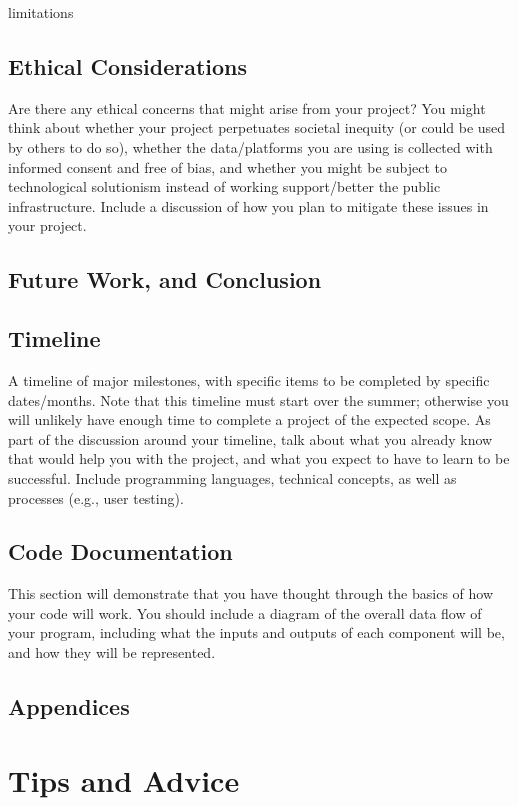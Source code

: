 \documentclass[10pt,twocolumn]{article}
\begin{document}
limitations

\subsection{Ethical Considerations}

Are there any ethical concerns that might arise from your project?
You might think about whether your project perpetuates societal inequity (or could be used by others to do so), whether the data/platforms you are using is collected with informed consent and free of bias, and whether you might be subject to technological solutionism instead of working support/better the public infrastructure.
Include a discussion of how you plan to mitigate these issues in your project.

\subsection{Future Work, and Conclusion}

\subsection{Timeline}

A timeline of major milestones, with specific items to be completed by specific dates/months.
Note that this timeline must start over the summer; otherwise you will unlikely have enough time to complete a project of the expected scope.
As part of the discussion around your timeline, talk about what you already know that would help you with the project, and what you expect to have to learn to be successful.
Include programming languages, technical concepts, as well as processes (e.g., user testing).

\subsection{Code Documentation}

This section will demonstrate that you have thought through the basics of how your code will work. You should include a diagram of the overall data flow of your program, including what the inputs and outputs of each component will be, and how they will be represented.

\subsection{Appendices}

\section{Tips and Advice}

\printbibliography
\end{document}
